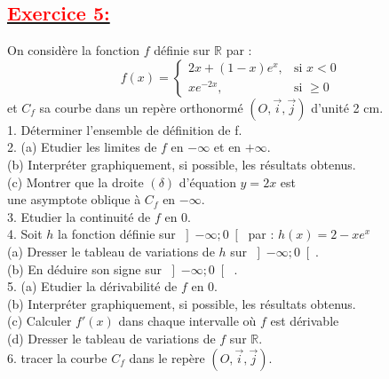 \documentclass[12pt]{article}
\begin{document}
\subsection*{\underline{\textbf{\textcolor{red}{Exercice 5:}}}}
On considère la fonction $f$ définie sur $\mathbb{R}$ par :\\
\[ f(x) = \begin{cases} 
  2x+(1-x)e^{x}, & \text{si } x < 0 \\
  xe^{-2x}, & \text{si } \geq 0
\end{cases} \]
et $C_{f}$ sa courbe dans un repère orthonormé $(O,\vec{i},\vec{j})$ d’unité 2 cm.\\
1. Déterminer l’ensemble de définition de f.\\
2. (a) Etudier les limites de $f$ en $-\infty$ et en $+\infty$.\\
(b) Interpréter graphiquement, si possible, les résultats obtenus.\\
(c) Montrer que la droite $(\delta)$ d’équation $y = 2x$ est\\
une asymptote oblique à $C_{f}$ en $-\infty$.\\
3. Etudier la continuité de $f$ en 0.\\
4. Soit $h$ la fonction définie sur $\left] -\infty;0  \right[$ par : $h(x) = 2 - xe^{x}$\\
(a) Dresser le tableau de variations de $h$ sur $\left]-\infty; 0\right[ $.\\
(b) En déduire son signe sur $\left] -\infty; 0\right[$ .\\
5. (a) Etudier la dérivabilité de $f$ en $0$.\\
(b) Interpréter graphiquement, si possible, les résultats obtenus.\\
(c) Calculer $f'(x)$ dans chaque intervalle où $f$ est dérivable\\
(d) Dresser le tableau de variations de $f$ sur $\mathbb{R}$.\\
6. tracer la courbe $C_{f}$ dans le repère $(O,\vec{i},\vec{j})$.\\
\end{document}
